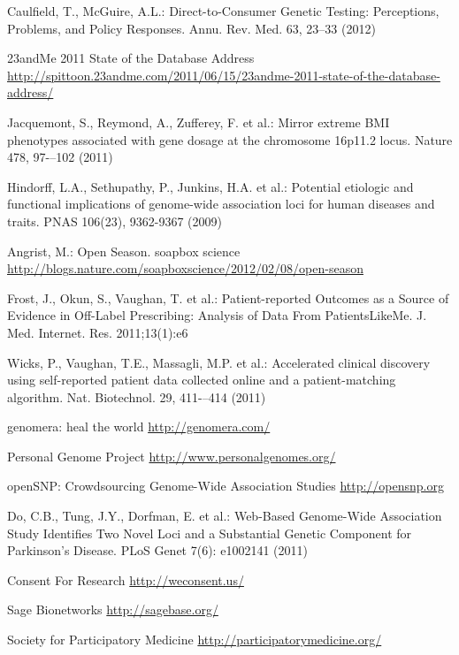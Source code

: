 \documentclass[runningheads,a4paper]{llncs}
\begin{document}
\begin{thebibliography}{4}
 Caulfield, T., McGuire, A.L.: Direct-to-Consumer Genetic Testing: Perceptions, Problems, and Policy Responses. Annu. Rev. Med. 63, 23--33 (2012)

 23andMe 2011 State of the Database Address \url{http://spittoon.23andme.com/2011/06/15/23andme-2011-state-of-the-database-address/}

 Jacquemont, S., Reymond, A., Zufferey, F. et al.: Mirror extreme BMI phenotypes associated with gene dosage at the chromosome 16p11.2 locus. Nature 478, 97-–102 (2011)

 Hindorff, L.A., Sethupathy, P., Junkins, H.A. et al.: Potential etiologic and functional implications of genome-wide association loci for human diseases and traits. PNAS 106(23), 9362-9367 (2009)

 Angrist, M.: Open Season. soapbox science \url{http://blogs.nature.com/soapboxscience/2012/02/08/open-season}

 Frost, J., Okun, S., Vaughan, T. et al.: Patient-reported Outcomes as a Source of Evidence in Off-Label Prescribing: Analysis of Data From PatientsLikeMe. J. Med. Internet. Res. 2011;13(1):e6

 Wicks, P., Vaughan, T.E., Massagli, M.P. et al.: Accelerated clinical discovery using self-reported patient data collected online and a patient-matching algorithm. Nat. Biotechnol. 29, 411-–414 (2011)

 genomera: heal the world \url{http://genomera.com/}

 Personal Genome Project \url{http://www.personalgenomes.org/}

 openSNP: Crowdsourcing Genome-Wide Association Studies \url{http://opensnp.org}

 Do, C.B., Tung, J.Y., Dorfman, E. et al.: Web-Based Genome-Wide Association Study Identifies Two Novel Loci and a Substantial Genetic Component for Parkinson's Disease. PLoS Genet 7(6): e1002141 (2011)

 Consent For Research \url{http://weconsent.us/}

 Sage Bionetworks \url{http://sagebase.org/}

 Society for Participatory Medicine \url{http://participatorymedicine.org/}

\end{thebibliography}
\end{document}
